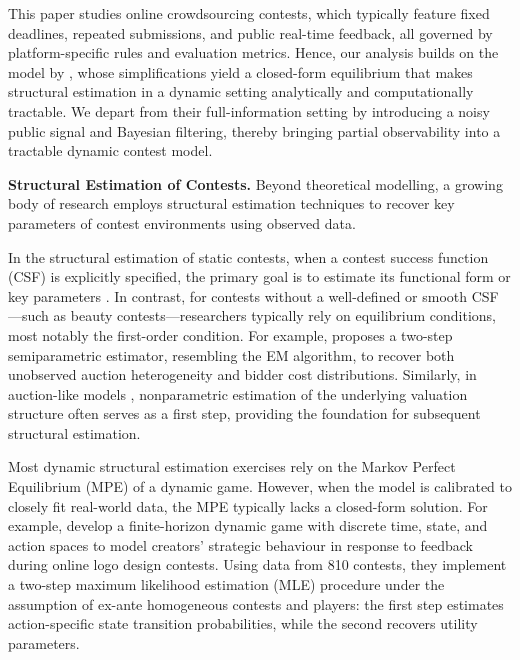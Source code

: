 \documentclass[mnsc]{informs3}
\begin{document}
This paper studies online crowdsourcing contests, which typically feature fixed deadlines, repeated submissions, and public real-time feedback, all governed by platform-specific rules and evaluation metrics.
Hence, our analysis builds on the model by \citet{Ryvkin2022Fight}, whose simplifications yield a closed-form equilibrium that makes structural estimation in a dynamic setting analytically and computationally tractable.
We depart from their full-information setting by introducing a noisy public signal and Bayesian filtering, thereby bringing partial observability into a tractable dynamic contest model.



\textbf{Structural Estimation of Contests.}
Beyond theoretical modelling, a growing body of research employs structural estimation techniques to recover key parameters of contest environments using observed data.

In the structural estimation of static contests, when a contest success function (CSF) is explicitly specified, the primary goal is to estimate its functional form or key parameters \citep{hwang2012technology, kang2016policy, huang2021structural}.
In contrast, for contests without a well-defined or smooth CSF—such as beauty contests—researchers typically rely on equilibrium conditions, most notably the first-order condition.
For example, \citet{yoganarasimhan2016estimation} proposes a two-step semiparametric estimator, resembling the EM algorithm, to recover both unobserved auction heterogeneity and bidder cost distributions.
Similarly, in auction-like models \citep{guerre2000optimal, shakhgildyan2022nonparametric}, nonparametric estimation of the underlying valuation structure often serves as a first step, providing the foundation for subsequent structural estimation.

Most dynamic structural estimation exercises rely on the Markov Perfect Equilibrium (MPE) of a dynamic game.
However, when the model is calibrated to closely fit real-world data, the MPE typically lacks a closed-form solution.
For example, \citet{jiang2022feedback} develop a finite-horizon dynamic game with discrete time, state, and action spaces to model creators’ strategic behaviour in response to feedback during online logo design contests.
Using data from 810 contests, they implement a two-step maximum likelihood estimation (MLE) procedure under the assumption of ex-ante homogeneous contests and players: the first step estimates action-specific state transition probabilities, while the second recovers utility parameters.
\end{document}
